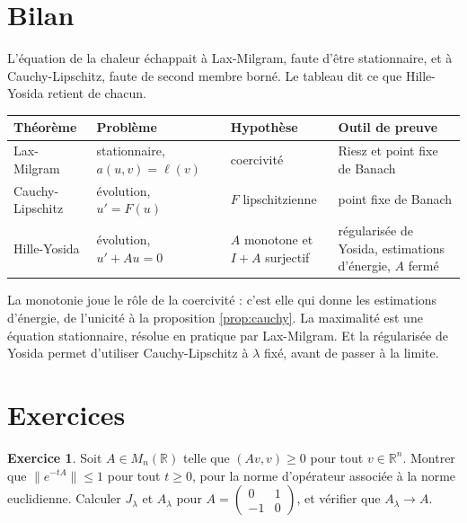 \documentclass[11pt,a4paper]{article}
\theoremstyle{plain}
\theoremstyle{definition}
\newtheorem{exercice}{Exercice}
\theoremstyle{remark}
\newcommand{\R}{\mathbb{R}}
\begin{document}
\section{Bilan}

L'équation de la chaleur échappait à Lax-Milgram, faute d'être stationnaire, et à Cauchy-Lipschitz, faute de second membre borné. Le tableau dit ce que Hille-Yosida retient de chacun.

\begin{center}
\renewcommand{\arraystretch}{1.25}
\begin{tabular}{@{}p{3.2cm}p{3.6cm}p{3.6cm}p{4.2cm}@{}}
\toprule
\textbf{Théorème} & \textbf{Problème} & \textbf{Hypothèse} & \textbf{Outil de preuve} \\
\midrule
Lax-Milgram & stationnaire, $a(u,v)=\ell(v)$ & coercivité & Riesz et point fixe de Banach \\
Cauchy-Lipschitz & évolution, $u'=F(u)$ & $F$ lipschitzienne & point fixe de Banach \\
Hille-Yosida & évolution, $u'+Au=0$ & $A$ monotone et $I+A$ surjectif & régularisée de Yosida, estimations d'énergie, $A$ fermé \\
\bottomrule
\end{tabular}
\end{center}

La monotonie joue le rôle de la coercivité : c'est elle qui donne les estimations d'énergie, de l'unicité à la proposition \ref{prop:cauchy}. La maximalité est une équation stationnaire, résolue en pratique par Lax-Milgram. Et la régularisée de Yosida permet d'utiliser Cauchy-Lipschitz à $\lambda$ fixé, avant de passer à la limite.

\section{Exercices}

\begin{exercice}\label{exo:dimfinie}
Soit $A\in M_n(\R)$ telle que $(Av,v)\geq0$ pour tout $v\in\R^n$. Montrer que $\|e^{-tA}\|\leq1$ pour tout $t\geq0$, pour la norme d'opérateur associée à la norme euclidienne. Calculer $J_\lambda$ et $A_\lambda$ pour $A=\begin{pmatrix}0&1\\-1&0\end{pmatrix}$, et vérifier que $A_\lambda\to A$.
\end{exercice}
\end{document}
